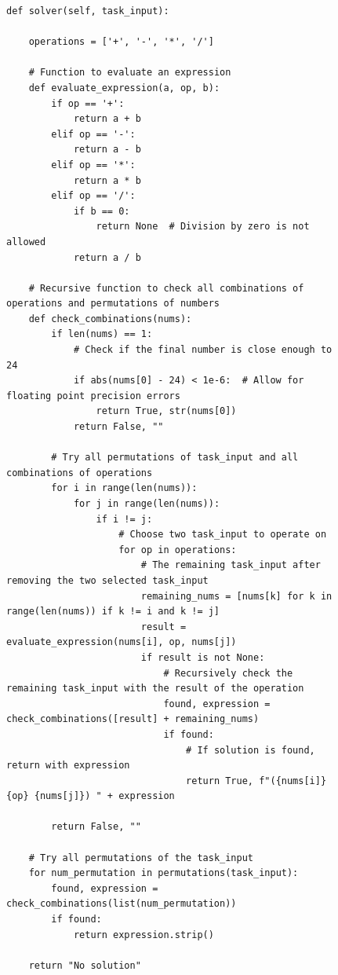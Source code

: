 \documentclass[11pt]{article}
\begin{document}
\begin{figure}[ht]
\begin{lstlisting}[style=pythonstyle, caption={Final code based on search algorithm for Game of 24.}]
def solver(self, task_input):

    operations = ['+', '-', '*', '/']

    # Function to evaluate an expression
    def evaluate_expression(a, op, b):
        if op == '+':
            return a + b
        elif op == '-':
            return a - b
        elif op == '*':
            return a * b
        elif op == '/':
            if b == 0:
                return None  # Division by zero is not allowed
            return a / b

    # Recursive function to check all combinations of operations and permutations of numbers
    def check_combinations(nums):
        if len(nums) == 1:
            # Check if the final number is close enough to 24
            if abs(nums[0] - 24) < 1e-6:  # Allow for floating point precision errors
                return True, str(nums[0])
            return False, ""

        # Try all permutations of task_input and all combinations of operations
        for i in range(len(nums)):
            for j in range(len(nums)):
                if i != j:
                    # Choose two task_input to operate on
                    for op in operations:
                        # The remaining task_input after removing the two selected task_input
                        remaining_nums = [nums[k] for k in range(len(nums)) if k != i and k != j]
                        result = evaluate_expression(nums[i], op, nums[j])
                        if result is not None:
                            # Recursively check the remaining task_input with the result of the operation
                            found, expression = check_combinations([result] + remaining_nums)
                            if found:
                                # If solution is found, return with expression
                                return True, f"({nums[i]} {op} {nums[j]}) " + expression

        return False, ""

    # Try all permutations of the task_input
    for num_permutation in permutations(task_input):
        found, expression = check_combinations(list(num_permutation))
        if found:
            return expression.strip()

    return "No solution"

\end{lstlisting}
\end{figure}
\end{document}
